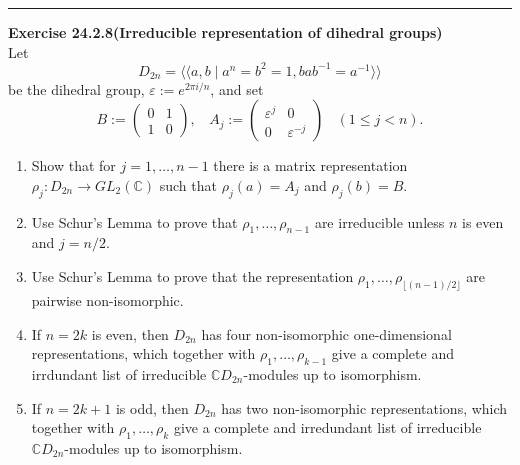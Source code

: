 \documentclass[a4paper, 12pt]{article}
\newenvironment{problem}[2][Exercise]
    { \begin{mdframed}[backgroundcolor=gray!20] \textbf{#1 #2} \\}
    {  \end{mdframed}}
\newcommand{\la}{\langle}
\newcommand{\ra}{\rangle}
\begin{document}
\noindent\rule{7in}{2.8pt}
\begin{problem}{24.2.8(Irreducible representation of dihedral groups)}
Let 
\[D_{2n}=\la\la a,b\mid a^n=b^2=1, bab^{-1}=a^{-1}\ra\ra\]
be the dihedral group, \(\varepsilon:=e^{2\pi i/n}\), and set 
\[B:=\begin{pmatrix}
	0&1\\ 
	1&0
\end{pmatrix},\ \ \ \ A_j:=\begin{pmatrix}
	\varepsilon^j&0\\ 
	0&\varepsilon^{-j}
\end{pmatrix}\ \ \ \ (1\leq j<n).\]
\begin{enumerate}[(1)]
\item Show that for \(j=1,\ldots,n-1\) there is a matrix representation \(\rho_j:D_{2n}\rightarrow GL_2(\mathbb{C})\) such that \(\rho_j(a)=A_j\) and \(\rho_j(b)=B\). 
\item Use Schur's Lemma to prove that \(\rho_1,\ldots,\rho_{n-1}\) are irreducible unless \(n\) is even and \(j=n/2\). 
\item Use Schur's Lemma to prove that the representation \(\rho_1, \ldots,\rho_{\lfloor (n-1)/2\rfloor}\) are pairwise non-isomorphic. 
\item If \(n=2k\) is even, then \(D_{2n}\) has four non-isomorphic one-dimensional representations, which together with \(\rho_1,\ldots,\rho_{k-1}\) give a complete and irrdundant list of irreducible \(\mathbb{C}D_{2n}\)-modules up to isomorphism. 
\item If \(n=2k+1\) is odd, then \(D_{2n}\) has two non-isomorphic representations, which together with \(\rho_1,\ldots,\rho_k\) give a complete and irredundant list of irreducible \(\mathbb{C}D_{2n}\)-modules up to isomorphism.
\end{enumerate}
\end{problem}
\end{document}

